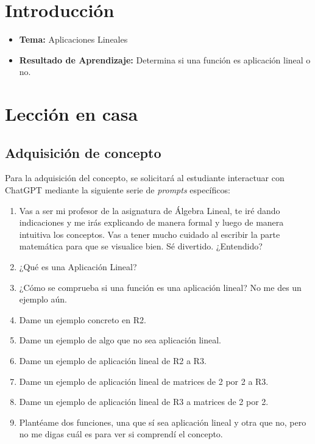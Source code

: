 \documentclass[a4,11pt]{aleph-notas}
\begin{document}
\encabezado


\section*{Introducción}

\begin{itemize}
    \item \textbf{Tema:} Aplicaciones Lineales
    \item \textbf{Resultado de Aprendizaje:} Determina si una función es aplicación lineal o no.
\end{itemize}

\section{Lección en casa}

\subsection{Adquisición de concepto}

Para la adquisición del concepto, se solicitará al estudiante interactuar con ChatGPT mediante la siguiente serie de \textit{prompts} específicos:

\begin{enumerate}[label=\textit{Prompt \arabic*.},leftmargin=2.1cm]
     \item Vas a ser mi profesor de la asignatura de Álgebra Lineal, te iré dando indicaciones y me irás explicando de manera formal y luego de manera intuitiva los conceptos. Vas a tener mucho cuidado al escribir la parte matemática para que se visualice bien. Sé divertido. ¿Entendido?
        \item ¿Qué es una Aplicación Lineal?
        \item ¿Cómo se comprueba si una función es una aplicación lineal? No me des un ejemplo aún.
        \item Dame un ejemplo concreto en R2.
        \item Dame un ejemplo de algo que no sea aplicación lineal.
        \item Dame un ejemplo de aplicación lineal de R2 a R3.
        \item Dame un ejemplo de aplicación lineal de matrices de 2 por 2 a R3.
        \item Dame un ejemplo de aplicación lineal de R3 a matrices de 2 por 2.
        \item Plantéame dos funciones, una que sí sea aplicación lineal y otra que no, pero no me digas cuál es para ver si comprendí el concepto.
\end{enumerate}
\end{document}
